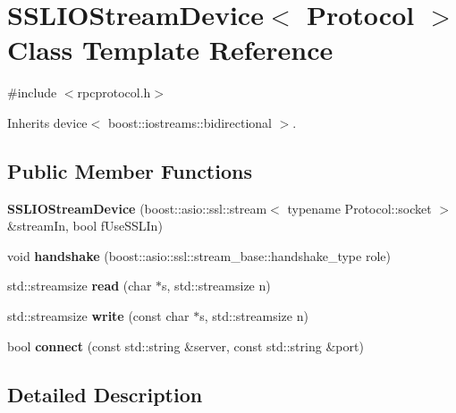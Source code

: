 \hypertarget{class_s_s_l_i_o_stream_device}{}\section{S\+S\+L\+I\+O\+Stream\+Device$<$ Protocol $>$ Class Template Reference}
\label{class_s_s_l_i_o_stream_device}


{\ttfamily \#include $<$rpcprotocol.\+h$>$}



Inherits device$<$ boost\+::iostreams\+::bidirectional $>$.

\subsection*{Public Member Functions}
\begin{DoxyCompactItemize}
\item 
\mbox{\label{class_s_s_l_i_o_stream_device_a603e5709babdeaaa68c159a2895d7f2e}} 
{\bfseries S\+S\+L\+I\+O\+Stream\+Device} (boost\+::asio\+::ssl\+::stream$<$ typename Protocol\+::socket $>$ \&stream\+In, bool f\+Use\+S\+S\+L\+In)
\item 
\mbox{\label{class_s_s_l_i_o_stream_device_a6607d02de410f1c731bf1dcf3bac9bb5}} 
void {\bfseries handshake} (boost\+::asio\+::ssl\+::stream\+\_\+base\+::handshake\+\_\+type role)
\item 
\mbox{\label{class_s_s_l_i_o_stream_device_a8beb626f163adac311a5ec507c3e495a}} 
std\+::streamsize {\bfseries read} (char $\ast$s, std\+::streamsize n)
\item 
\mbox{\label{class_s_s_l_i_o_stream_device_aa4bfad893484ffdf9dbcdce97c462ad0}} 
std\+::streamsize {\bfseries write} (const char $\ast$s, std\+::streamsize n)
\item 
\mbox{\label{class_s_s_l_i_o_stream_device_acdded14a6c79e263989ebf8aea392405}} 
bool {\bfseries connect} (const std\+::string \&server, const std\+::string \&port)
\end{DoxyCompactItemize}


\subsection{Detailed Description}
